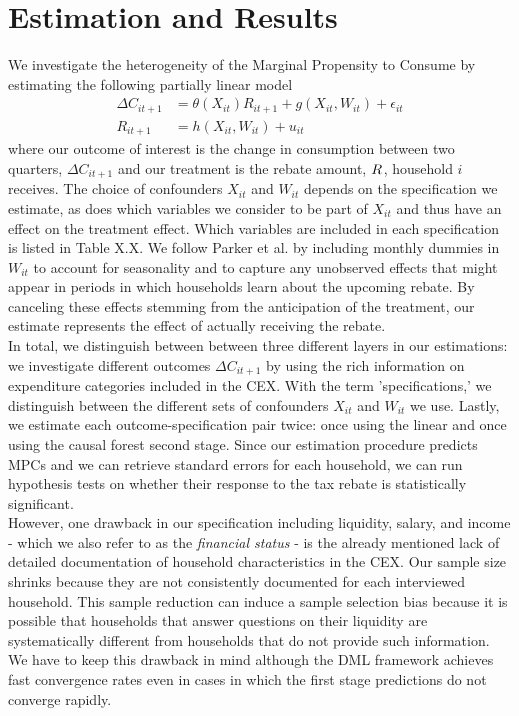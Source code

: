 \section{Estimation and Results} \label{sec:estim_res}
We investigate the heterogeneity of the Marginal Propensity to Consume by estimating the following partially linear model
\begin{align}
    \Delta C_{it+1}&=\theta(X_{it})R_{it+1}+g(X_{it}, W_{it})+\epsilon_{it} \label{eq:plm_C1}\\
    R_{it+1}&=h(X_{it}, W_{it})+u_{it} \label{eq:plm_C2}
\end{align}
where our outcome of interest is the change in consumption between two quarters, $\Delta C_{it+1}$ and our treatment is the rebate amount, $R_{
\it}$, household $i$ receives. The choice of confounders $X_{it}$ and $W_{it}$ depends on the specification we estimate, as does which variables we consider to be part of $X_{it}$ and thus have an effect on the treatment effect. Which variables are included in each specification is listed in Table X.X. We follow Parker et al. by including monthly dummies in $W_{it}$ to account for seasonality and to capture any unobserved effects that might appear in periods in which households learn about the upcoming rebate. By canceling these effects stemming from the anticipation of the treatment, our estimate represents the effect of actually receiving the rebate. \\ 
In total, we distinguish between between three different layers in our estimations: we investigate different outcomes $\Delta C_{it+1}$ by using the rich information on expenditure categories included in the CEX. With the term 'specifications,' we distinguish between the different sets of confounders $X_{it}$ and $W_{it}$ we use. Lastly, we estimate each outcome-specification pair twice: once using the linear and once using the causal forest second stage. Since our estimation procedure predicts MPCs and we can retrieve standard errors for each household, we can run hypothesis tests on whether their response to the tax rebate is statistically significant. \\
However, one drawback in our specification including liquidity, salary, and income - which we also refer to as the \textit{financial status} - is the already mentioned lack of detailed documentation of household characteristics in the CEX. Our sample size shrinks because they are not consistently documented for each interviewed household. This sample reduction can induce a sample selection bias because it is possible that households that answer questions on their liquidity are systematically different from households that do not provide such information. We have to keep this drawback in mind although the DML framework achieves fast convergence rates even in cases in which the first stage predictions do not converge rapidly.

